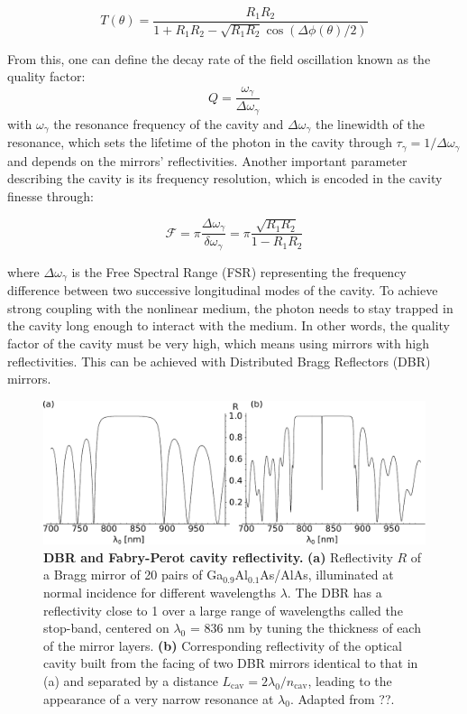 \begin{equation}
    T(\theta)=\frac{R_1R_2}{1+R_1R_2-\sqrt{R_1R_2}\cos(\Delta \phi(\theta)/2)}
    \label{eq:transmission_theta}
\end{equation}

\noindent From this, one can define the decay rate of the field oscillation known as the quality factor:
\begin{equation}
    Q=\frac{\omega_\gamma}{\Delta \omega_\gamma}
    \label{eq:Q}
\end{equation}
with $\omega_\gamma$ the resonance frequency of the cavity and $\Delta \omega_\gamma$ the linewidth of the resonance, which sets the lifetime of the photon in the cavity through $\tau_\gamma=1/\Delta \omega_\gamma$ and depends on the mirrors' reflectivities. Another important parameter describing the cavity is its frequency resolution, which is encoded in the cavity finesse through:

\begin{equation}
    \mathcal{F}=\pi \frac{\Delta \omega_\gamma}{\delta \omega_\gamma} = \pi \frac{\sqrt{R_1R_2}}{1-R_1R_2}
    \label{eq:F}
\end{equation}

where $\Delta \omega_\gamma$ is the Free Spectral Range (FSR) representing the frequency difference between two successive longitudinal modes of the cavity. To achieve strong coupling with the nonlinear medium, the photon needs to stay trapped in the cavity long enough to interact with the medium. In other words, the quality factor of the cavity must be very high, which means using mirrors with high reflectivities. This can be achieved with Distributed Bragg Reflectors (DBR) mirrors.

\begin{figure}[h]
    \centering
    \includegraphics[width=1\linewidth]{chap1/fig/DBR.pdf}
    \caption{\textbf{DBR and Fabry-Perot cavity reflectivity.} \textbf{(a)} Reflectivity $R$ of a Bragg mirror of 20 pairs of Ga$_{0.9}$Al$_{0.1}$As/AlAs, illuminated at normal incidence for different wavelengths $\lambda$. The DBR has a reflectivity close to 1 over a large range of wavelengths called the stop-band, centered on $\lambda_0$ = 836 nm by tuning the thickness of each of the mirror layers. \textbf{(b)} Corresponding reflectivity of the optical cavity built from the facing of two DBR mirrors identical to that in (a) and separated by a distance $L_{\mathrm{cav}} = 2\lambda_0 / n_{\mathrm{cav}}$, leading to the appearance of a very narrow resonance at $\lambda_0$. Adapted from ??.}
    \label{fig:DBR}
\end{figure}

